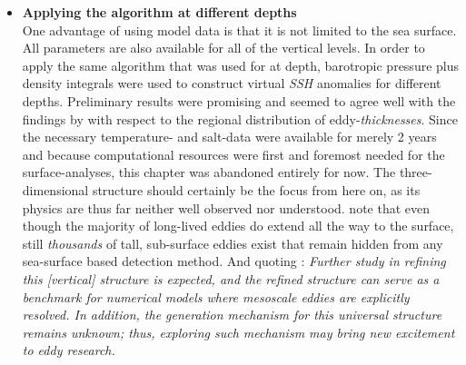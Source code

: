 \begin{itemize}
\setlength\itemsep{2mm}
\item
\textbf{Applying the algorithm at different depths}\\
One advantage of using model data is that it is not limited to the sea surface. All parameters are also available for all of the vertical levels. In order to apply the same algorithm that was used for \SSH at depth, barotropic pressure plus density integrals were used to construct virtual \textit{SSH} anomalies for different depths. Preliminary results were promising and seemed to agree well with the findings by \citet{Petersen2013} with respect to the regional distribution of eddy-\textit{thicknesses}. Since the necessary temperature- and salt-data were available for merely 2 years and because computational resources were first and foremost needed for the surface-analyses, this chapter was abandoned entirely for now.
The three-dimensional structure should certainly be the focus from here on, as its physics are thus far neither well observed nor understood.  \eg note that even though the majority of long-lived eddies do extend all the way to the surface, still \textit{thousands} of tall, sub-surface eddies exist that remain hidden from any sea-surface based detection method. And quoting \citep{Zhang2013}: \textit{Further study in refining this [vertical] structure is expected, and the refined structure can serve as a benchmark for numerical models where mesoscale eddies are explicitly resolved. In addition, the generation mechanism for this universal structure remains unknown; thus, exploring such mechanism may bring new excitement to eddy research.} \\


\end{itemize}
